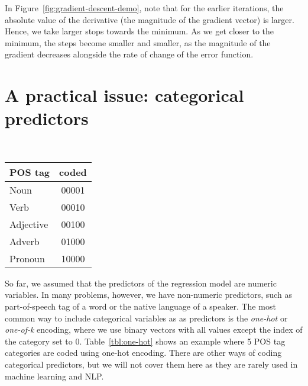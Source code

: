 In Figure~\ref{fig:gradient-descent-demo},
note that for the earlier iterations,
the absolute value of the derivative
(the magnitude of the gradient vector) is larger.
Hence, we take larger stops towards the minimum.
As we get closer to the minimum, the steps become smaller and smaller,
as the magnitude of the gradient decreases
alongside the rate of change of the error function.

\section{A practical issue: categorical predictors}

\begin{margintable}
  \centering
  \caption{\label{tbl:one-hot}%
    Example one-hot encoding of five POS tag categories.
  }
  ~\\[1mm]
  \begin{tabular}{lS[minimum-integer-digits=5,table-format=5.0,table-align-uncertainty=false]}
    \toprule
    POS tag & {coded}\\
    \midrule
    Noun      & 00001\\
    Verb      & 00010\\
    Adjective & 00100\\
    Adverb    & 01000\\
    Pronoun   & 10000\\
    \bottomrule
  \end{tabular}
\end{margintable}
So far,
we assumed that the predictors of the regression model are numeric variables.
In many problems, however, we have non-numeric predictors,
such as part-of-speech tag of a word or the native language of a speaker.
The most common way to include categorical variables as as predictors
is the \emph{one-hot} or \emph{one-of-k} encoding,
where we use binary vectors with all values except the index of the category
set to \num{0}.
Table~\ref{tbl:one-hot} shows an example
where 5 POS tag categories are coded using one-hot encoding.
There are other ways of coding categorical predictors,
but we will not cover them here as they are rarely used in machine learning and NLP.


